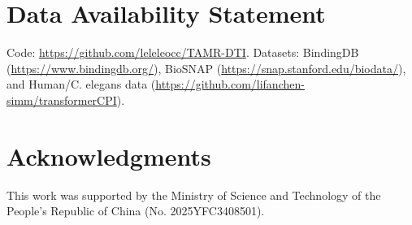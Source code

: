 \section*{\mdseries Data Availability Statement}
Code: \url{https://github.com/leleleocc/TAMR-DTI}. Datasets: BindingDB
(\url{https://www.bindingdb.org/}), BioSNAP
(\url{https://snap.stanford.edu/biodata/}), and Human/C. elegans data
(\url{https://github.com/lifanchen-simm/transformerCPI}).

\vspace{1em}
\section*{\mdseries Acknowledgments}
This work was supported by the Ministry of Science and Technology of the People's
Republic of China (No. 2025YFC3408501).
